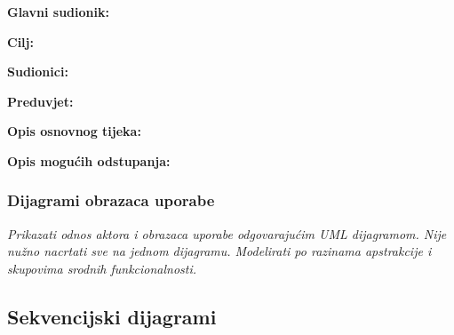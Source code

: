 \noindent {}
\begin{packed_item}

	\item \textbf{Glavni sudionik: }
	\item  \textbf{Cilj:}
	\item  \textbf{Sudionici:}
	\item  \textbf{Preduvjet:}
	\item  \textbf{Opis osnovnog tijeka:}

	\item[] \begin{packed_enum}

		\item
		\item
		\item
		\item
		\item
	\end{packed_enum}

	\item  \textbf{Opis mogućih odstupanja:}

	\item[] \begin{packed_item}

		\item[2.a]
		\item[] \begin{packed_enum}

			\item
			\item

		\end{packed_enum}
		\item[2.b]
		\item[3.a]

	\end{packed_item}
\end{packed_item}


\subsubsection{Dijagrami obrazaca uporabe}

\textit{Prikazati odnos aktora i obrazaca uporabe odgovarajućim UML dijagramom. Nije nužno nacrtati sve na jednom dijagramu. Modelirati po razinama apstrakcije i skupovima srodnih funkcionalnosti.}
\eject

\subsection{Sekvencijski dijagrami}


